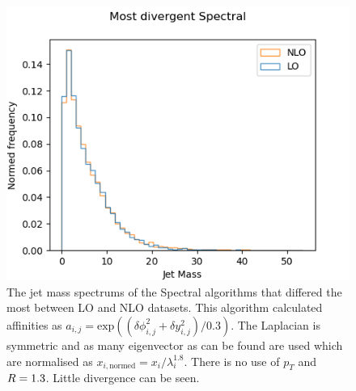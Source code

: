 \begin{figure}[htp]
\begin{minipage}[c]{0.45\textwidth}
        \includegraphics[width=\textwidth]{graphics/worst_spectral_histOnly.png}
        \caption{The jet mass spectrums of the Spectral algorithms that
                 differed the most between LO and NLO datasets.
                 This algorithm calculated affinities as
                 \(a_{i,j} = \text{exp}\left((\delta \phi_{i, j}^2 + \delta y_{i, j}^2)/0.3\right)\).
                 The Laplacian is symmetric and 
                 as many eigenvector as can be found are used which are
                 normalised as \(x_{i,\text{normed}} = x_i/\lambda_i^{1.8}\).
                 There is no use of \(p_T\) and \(R{} = 1.3\).
                 Little divergence can be seen.
        }\label{fig:spectralircexample}
    \end{minipage}
\end{figure}    

